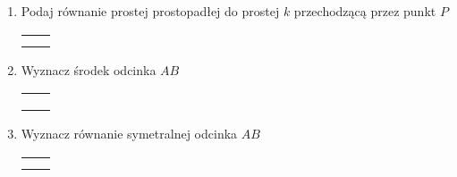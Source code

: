 \documentclass[12pt,a4paper]{article}
\begin{document}
\begin{enumerate}[1.]
 	\item Podaj równanie prostej prostopadłej do prostej $k$ przechodzącą przez punkt $P$
 	
 	\begin{enumerate}[a)] \begin{tabular}{p{7cm} p{7cm}}
 			\item $k:y=-\frac{1}{2}x+4$, $P=(1,-3)$& \item $k:y=\frac{1}{2}x+4$, $P=(-2,-1)$ \\
 			\item $k:y=x$, $P=(-7,4)$& \item $k:y=4x+\pi$, $P=(-4,3)$ \\
 	\end{tabular} \end{enumerate}
 	
 	\item Wyznacz środek odcinka $AB$
 	
 	\begin{enumerate}[a)] \begin{tabular}{p{7cm} p{7cm}}
 			\item $A=(1,3)$, $B=(7,3)$& \item $A=(7,3)$, $B=(8,5)$ \\
 			\item $A=(-3,0)$, $B=(1,-6)$& \item $A=(-5,6)$, $B=(-9,-6)$ \\
 			\item $A=(12,-5)$, $B=(22,11)$& \item $A=(-4,5)$, $B=(-5,4)$ \\
 	\end{tabular} \end{enumerate}
 	
 	\item Wyznacz równanie symetralnej odcinka $AB$
 	
 	 \begin{enumerate}[a)] \begin{tabular}{p{7cm} p{7cm}}
 			\item $A=(0,0)$, $B=(2,4)$& \item $A=(-4,-3)$, $B=(2,3)$ \\
 			\item $A=(3,1)$, $B=(-1,1)$& \item $A=(-5,4)$, $B=(5,5)$ \\
 	\end{tabular} \end{enumerate}
 	\newpage
 	

\end{enumerate}
\end{document}
